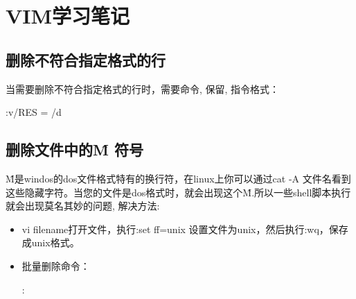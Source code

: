 \section{VIM学习笔记}

\subsection{删除不符合指定格式的行}
当需要删除不符合指定格式的行时，需要命令, 保留, 指令格式：
\begin{messagebox}
:v/RES = /d
\end{messagebox}

\subsection{删除文件中的\^M 符号}
\^M是windos的dos文件格式特有的换行符，在linux上你可以通过cat -A 文件名看到这些隐藏字符。当您的文件是dos格式时，就会出现这个\^M.所以一些shell脚本执行就会出现莫名其妙的问题, 解决方法:
\begin{itemize}
\item vi filename打开文件，执行:set ff=unix 设置文件为unix，然后执行:wq，保存成unix格式。
\item 批量删除命令：
\begin{messagebox}
:%
\end{messagebox}
\end{itemize}
